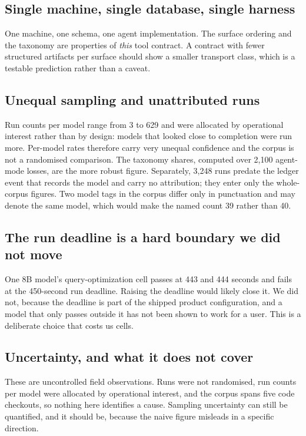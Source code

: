 \documentclass[11pt]{article}
\begin{document}
\subsection{Single machine, single database, single harness}

One machine, one schema, one agent implementation. The surface ordering and the taxonomy are properties of
\emph{this} tool contract. A contract with fewer structured artifacts per surface should show a smaller transport
class, which is a testable prediction rather than a caveat.

\subsection{Unequal sampling and unattributed runs}

Run counts per model range from 3 to 629 and were allocated by operational interest rather than by design:
models that looked close to completion were run more. Per-model rates therefore carry very unequal confidence and
the corpus is not a randomised comparison. The taxonomy shares, computed over 2{,}100 agent-mode losses, are the more
robust figure. Separately, 3{,}248 runs predate the ledger event that records the model and carry no attribution; they
enter only the whole-corpus figures. Two model tags in the corpus differ only in punctuation and may denote the
same model, which would make the named count 39 rather than 40.

\subsection{The run deadline is a hard boundary we did not move}

One 8B model's query-optimization cell passes at 443 and 444 seconds and fails at the 450-second run deadline.
Raising the deadline would likely close it. We did not, because the deadline is part of the shipped product
configuration, and a model that only passes outside it has not been shown to work for a user. This is a
deliberate choice that costs us cells.

\subsection{Uncertainty, and what it does not cover}

These are uncontrolled field observations. Runs were not randomised, run counts per model were allocated by
operational interest, and the corpus spans five code checkouts, so nothing here identifies a cause. Sampling
uncertainty can still be quantified, and it should be, because the naive figure misleads in a specific direction.
\end{document}

